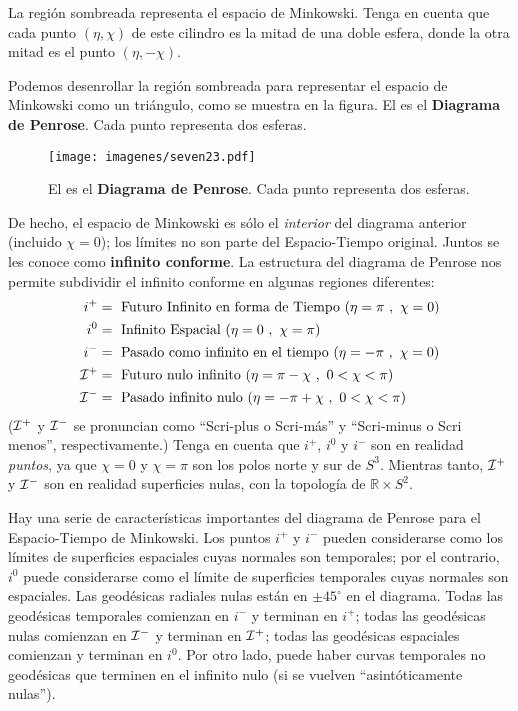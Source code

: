 \documentclass[11pt,b5paper,openany,twoside]{book}
\newcommand{\R}{\mathbb{R}}
\begin{document}
\noindent
La región sombreada representa el espacio de Minkowski. Tenga en cuenta que cada punto $(\eta,\chi)$ de este cilindro es la mitad de una doble esfera, donde la otra mitad es el punto $(\eta,-\chi)$.

Podemos desenrollar la región sombreada para representar el espacio de Minkowski como un triángulo, como se muestra en la figura.
El es el {\bf Diagrama de Penrose}. Cada punto representa dos esferas.
\begin{figure}[h]
\centering
\texttt{[image: imagenes/seven23.pdf]}
\caption{El es el {\bf Diagrama de Penrose}. Cada punto representa dos esferas.}
\end{figure}
De hecho, el espacio de Minkowski es sólo el {\it interior} del diagrama anterior (incluido $\chi=0$); los límites no son parte del Espacio-Tiempo original.
Juntos se les conoce como {\bf infinito conforme}.
La estructura del diagrama de Penrose nos permite subdividir el infinito conforme en algunas regiones diferentes:
\begin{equation*}
\begin{aligned}
i^+  &=  \text{ Futuro Infinito en forma de Tiempo } (\eta=\pi\ ,\ \chi=0) \\
i^0  &=  \text{ Infinito Espacial } (\eta=0\ ,\ \chi=\pi) \\
i^-  &=  \text{ Pasado como infinito en el tiempo } (\eta=-\pi\ ,\ \chi=0) \\
{\cal I}^+  &=  \text{ Futuro nulo infinito } (\eta=\pi-\chi\ ,\ 0<\chi<\pi) \\
{\cal I}^-  &=  \text{ Pasado infinito nulo } (\eta=-\pi+\chi\ ,\ 0<\chi<\pi)
\end{aligned}
\end{equation*}
(${\cal I}^+$ y ${\cal I}^-$ se pronuncian como ``Scri-plus o Scri-más'' y ``Scri-minus o Scri menos'', respectivamente.)
Tenga en cuenta que $i^+$, $i^0$ y $i^-$ son en realidad {\it puntos}, ya que $\chi=0$ y $\chi=\pi$ son los polos norte y sur de $S^3$.
Mientras tanto, ${\cal I}^+$ y ${\cal I}^-$ son en realidad superficies nulas, con la topología de $\R\times S^2$.

Hay una serie de características importantes del diagrama de Penrose para el Espacio-Tiempo de Minkowski.
Los puntos $i^+$ y $i^-$ pueden considerarse como los límites de superficies espaciales cuyas normales son temporales; por el contrario, $i^0$ puede considerarse como el límite de superficies temporales cuyas normales son espaciales.
Las geodésicas radiales nulas están en $\pm 45^\circ$ en el diagrama.
Todas las geodésicas temporales comienzan en $i^-$ y terminan en $i^+$; todas las geodésicas nulas comienzan en ${\cal I}^-$ y terminan en ${\cal I}^+$; todas las geodésicas espaciales comienzan y terminan en $i^0$.
Por otro lado, puede haber curvas temporales no geodésicas que terminen en el infinito nulo (si se vuelven ``asintóticamente nulas'').
\end{document}
